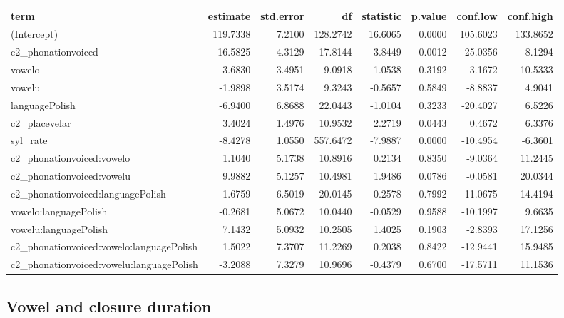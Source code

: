 \documentclass[preprint]{JASAnew}
\begin{document}
\begin{tabular}{lrrrrrrr}
\toprule
term & estimate & std.error & df & statistic & p.value & conf.low & conf.high\\
\midrule
(Intercept) & 119.7338 & 7.2100 & 128.2742 & 16.6065 & 0.0000 & 105.6023 & 133.8652\\
c2\_phonationvoiced & -16.5825 & 4.3129 & 17.8144 & -3.8449 & 0.0012 & -25.0356 & -8.1294\\
vowelo & 3.6830 & 3.4951 & 9.0918 & 1.0538 & 0.3192 & -3.1672 & 10.5333\\
vowelu & -1.9898 & 3.5174 & 9.3243 & -0.5657 & 0.5849 & -8.8837 & 4.9041\\
languagePolish & -6.9400 & 6.8688 & 22.0443 & -1.0104 & 0.3233 & -20.4027 & 6.5226\\
\addlinespace
c2\_placevelar & 3.4024 & 1.4976 & 10.9532 & 2.2719 & 0.0443 & 0.4672 & 6.3376\\
syl\_rate & -8.4278 & 1.0550 & 557.6472 & -7.9887 & 0.0000 & -10.4954 & -6.3601\\
c2\_phonationvoiced:vowelo & 1.1040 & 5.1738 & 10.8916 & 0.2134 & 0.8350 & -9.0364 & 11.2445\\
c2\_phonationvoiced:vowelu & 9.9882 & 5.1257 & 10.4981 & 1.9486 & 0.0786 & -0.0581 & 20.0344\\
c2\_phonationvoiced:languagePolish & 1.6759 & 6.5019 & 20.0145 & 0.2578 & 0.7992 & -11.0675 & 14.4194\\
\addlinespace
vowelo:languagePolish & -0.2681 & 5.0672 & 10.0440 & -0.0529 & 0.9588 & -10.1997 & 9.6635\\
vowelu:languagePolish & 7.1432 & 5.0932 & 10.2505 & 1.4025 & 0.1903 & -2.8393 & 17.1256\\
c2\_phonationvoiced:vowelo:languagePolish & 1.5022 & 7.3707 & 11.2269 & 0.2038 & 0.8422 & -12.9441 & 15.9485\\
c2\_phonationvoiced:vowelu:languagePolish & -3.2088 & 7.3279 & 10.9696 & -0.4379 & 0.6700 & -17.5711 & 11.1536\\
\bottomrule
\end{tabular}
\normalsize

\hypertarget{vowel-and-closure-duration-1}{%
\subsection{Vowel and closure
duration}\label{vowel-and-closure-duration-1}}

\scriptsize
\end{document}
